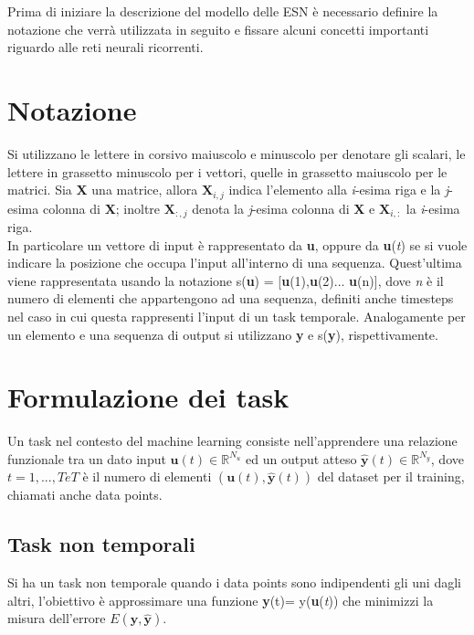 Prima di iniziare la descrizione del modello delle ESN è necessario definire la notazione che verrà utilizzata in seguito e fissare alcuni concetti importanti riguardo alle reti neurali ricorrenti.

\section{Notazione}\label{sec:notazione}
Si utilizzano le lettere in corsivo maiuscolo e minuscolo per denotare gli scalari, le lettere in grassetto minuscolo per i vettori, quelle in grassetto maiuscolo per le matrici.
Sia \textbf{X}  una matrice, allora $\textbf{X}_{i,j}$ indica l'elemento alla \textit{i}-esima riga e la \textit{j}-esima colonna di \textbf{X}; inoltre  $\textbf{X}_{:,j}$ denota la \textit{j}-esima colonna di \textbf{X} e $\textbf{X}_{i,:}$ la \textit{i}-esima riga.\\
In particolare un vettore di input è rappresentato da \textbf{u}, oppure da \textbf{u}(\textit{t}) se si vuole  indicare la posizione che occupa l'input all'interno di una sequenza. Quest'ultima viene rappresentata usando la notazione s(\textbf{u}) = [\textbf{u}(1),\textbf{u}(2)... \textbf{u}(n)], dove \textit{n} è il numero di elementi che appartengono ad una sequenza, definiti anche timesteps nel caso in cui questa rappresenti l'input di un task temporale. Analogamente per un elemento e una sequenza di output si utilizzano \textbf{y} e s(\textbf{y}), rispettivamente.

\section{Formulazione dei task}\label{sec:formproblema}
Un task nel contesto del machine learning consiste nell'apprendere una relazione funzionale tra un dato input $ \mathbf{u}(\mathit{t}) \in \mathbb{R}^{N_{u}} $ ed un output atteso $ \hat{\mathbf{y}}(\mathit{t}) \in \mathds{R}^{N_y} $, dove $ \mathit{t}=1,...,\mathit{T} e \mathit{T} $ è il numero di elementi $ {(\mathbf{u}(\mathit{t}),\hat{\mathbf{y}}(\mathit{t}))} $ del dataset per il training, chiamati anche data points.

\subsection{Task non temporali}\label{sec:tnt}
Si ha un task non temporale quando i data points sono indipendenti gli uni dagli altri, l'obiettivo è approssimare una funzione \textbf{y}(t)= y(\textbf{u}(\textit{t})) che minimizzi la misura dell'errore $E(\mathbf{y},\hat{\mathbf{y}})$.

